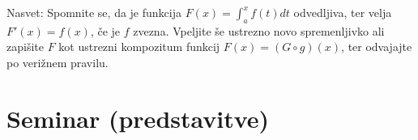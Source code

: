 \documentclass[11pt,a4paper]{exam}
\renewcommand{\{}{\lbrace}
\renewcommand{\}}{\rbrace}
\begin{document}
\begin{questions}
				Nasvet: Spomnite se, da je funkcija $F(x) = \int_{a}^{x} f(t) dt$ odvedljiva, ter velja $F'(x) = f(x)$, če je $f$ zvezna. Vpeljite še ustrezno novo spremenljivko ali zapišite $F$ kot ustrezni kompozitum funkcij $F(x) = (G \circ g)(x)$, ter odvajajte po verižnem pravilu.


\end{questions}
\section*{Seminar (predstavitve)}
\end{document}
